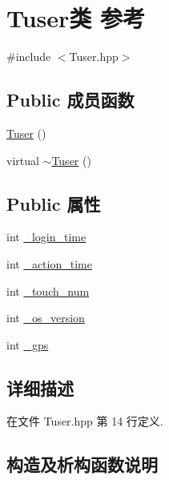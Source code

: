 \hypertarget{class_tuser}{}\section{Tuser类 参考}
\label{class_tuser}


{\ttfamily \#include $<$Tuser.\+hpp$>$}

\subsection*{Public 成员函数}
\begin{DoxyCompactItemize}
\item 
\hyperlink{class_tuser_ace9dca809b9dcab7646789c4ffa78e67}{Tuser} ()
\item 
virtual \hyperlink{class_tuser_a30a83f7c745d63351e4f46ba5c0461ae}{$\sim$\+Tuser} ()
\end{DoxyCompactItemize}
\subsection*{Public 属性}
\begin{DoxyCompactItemize}
\item 
int \hyperlink{class_tuser_a0545ffd37e769c80464f431aeb08df99}{\+\_\+login\+\_\+time}
\item 
int \hyperlink{class_tuser_adb55de79735514f3b2f98e0dec3fe825}{\+\_\+action\+\_\+time}
\item 
int \hyperlink{class_tuser_a4a4fe058fa573458edeee9555d90cb43}{\+\_\+touch\+\_\+num}
\item 
int \hyperlink{class_tuser_a1a88701de1c3ffb4f5ee964bfa940e51}{\+\_\+os\+\_\+version}
\item 
int \hyperlink{class_tuser_a654c53fd14a84adc262a303e7b39a958}{\+\_\+gps}
\end{DoxyCompactItemize}


\subsection{详细描述}


在文件 Tuser.\+hpp 第 14 行定义.



\subsection{构造及析构函数说明}
\hypertarget{class_tuser_ace9dca809b9dcab7646789c4ffa78e67}{}
